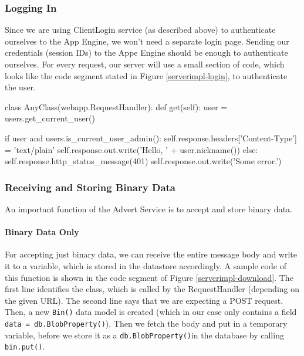 \subsubsection{Logging In}
Since we are using ClientLogin service (as described above) to authenticate
ourselves to the App Engine, we won't need a separate login page. Sending our
credentials (session IDs) to the Appe Engine should be enough to authenticate
ourselves. For every request, our server will use a small section of code, which
looks like the code segment stated in Figure \ref{serverimpl-login}, to
authenticate the user.

\begin{figure*}[ht] %
\begin{center}
\begin{code}
class AnyClass(webapp.RequestHandler):
  def get(self):
    user = users.get_current_user()

    if user and users.is_current_user_admin():
      self.response.headers['Content-Type'] = 'text/plain'
      self.response.out.write('Hello, ' + user.nickname())
    else:
      self.response.http_status_message(401)
      self.response.out.write('Some error.')
\end{code}
\caption{A MetaData Object.\label{serverimpl-login}}
\end{center}
\end{figure*}
      
\subsubsection{Receiving and Storing Binary Data}
An important function of the Advert Service is to accept and store binary data.

\paragraph{Binary Data Only}
For accepting just binary data, we can receive the entire message body and write
it to a variable, which is stored in the datastore accordingly. A sample code of
this function is shown in the code segment of Figure \ref{serverimpl-download}.
The first line identifies the class, which is called by the RequestHandler
(depending on the given URL). The second line says that we are expecting a POST
request. Then, a new \texttt{Bin()} data model is created (which in our case only
contains a field \texttt{data = db.BlobProperty()}). Then we fetch the body and
put in a temporary variable, before we store it as a \texttt{db.BlobProperty()}in
the database by calling \texttt{bin.put()}.

